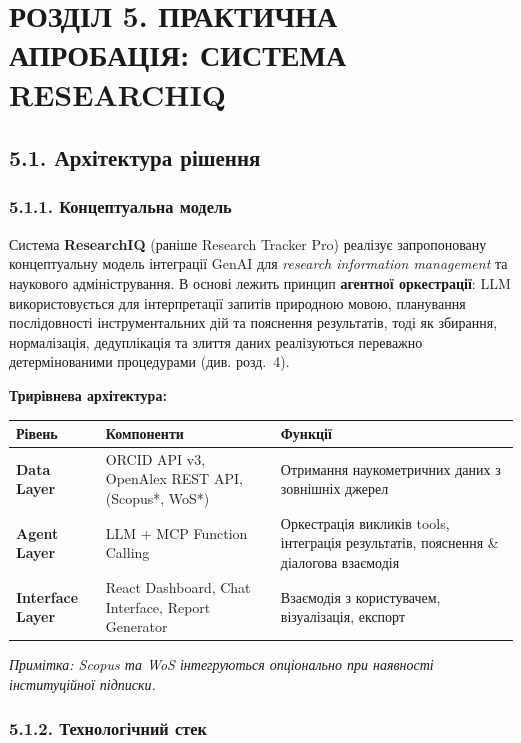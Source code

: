 \section*{РОЗДІЛ 5. ПРАКТИЧНА АПРОБАЦІЯ: СИСТЕМА RESEARCHIQ}

\subsection*{5.1. Архітектура рішення}

\subsubsection*{5.1.1. Концептуальна модель}

Система \textbf{ResearchIQ} (раніше Research Tracker Pro) реалізує запропоновану концептуальну модель інтеграції GenAI для \textit{research information management} та наукового адміністрування. В основі лежить принцип \textbf{агентної оркестрації}: LLM використовується для інтерпретації запитів природною мовою, планування послідовності інструментальних дій та пояснення результатів, тоді як збирання, нормалізація, дедуплікація та злиття даних реалізуються переважно детермінованими процедурами (див. розд.~4).

\textbf{Трирівнева архітектура:}

\begin{longtable}{@{}p{}p{}p{}@{}}
\toprule
\textbf{Рівень} & \textbf{Компоненти} & \textbf{Функції} \\
\midrule
\textbf{Data Layer} & ORCID API v3, OpenAlex REST API, (Scopus*, WoS*) & Отримання наукометричних даних з зовнішніх джерел \\
\textbf{Agent Layer} & LLM + MCP Function Calling & Оркестрація викликів tools, інтеграція результатів, пояснення \& діалогова взаємодія \\
\textbf{Interface Layer} & React Dashboard, Chat Interface, Report Generator & Взаємодія з користувачем, візуалізація, експорт \\
\bottomrule
\end{longtable}

\textit{Примітка: Scopus та WoS інтегруються опціонально при наявності інституційної підписки.}

\subsubsection*{5.1.2. Технологічний стек}

